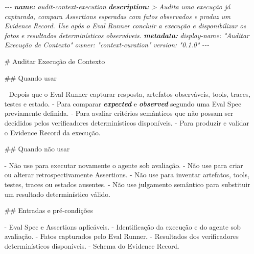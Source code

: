 \documentclass[
  10pt,
  a4paper,
  oneside]{book}
\newenvironment{Shaded}{}{}
\newcommand{\AnnotationTok}[1]{\textcolor[rgb]{0.38,0.63,0.69}{\textbf{\textit{#1}}}}
\newcommand{\CommentTok}[1]{\textcolor[rgb]{0.38,0.63,0.69}{\textit{#1}}}
\newcommand{\FunctionTok}[1]{\textcolor[rgb]{0.02,0.16,0.49}{#1}}
\newcommand{\InformationTok}[1]{\textcolor[rgb]{0.38,0.63,0.69}{\textbf{\textit{#1}}}}
\newcommand{\NormalTok}[1]{#1}
\newcommand{\SpecialStringTok}[1]{\textcolor[rgb]{0.73,0.40,0.53}{#1}}
\renewenvironment{Shaded}{\begin{snugshade}}{\end{snugshade}}%
\begin{document}
\begin{Shaded}
\begin{Highlighting}[]
\CommentTok{{-}{-}{-}}
\AnnotationTok{name:}\CommentTok{ audit{-}context{-}execution}
\AnnotationTok{description:}\CommentTok{ \textgreater{}}
\CommentTok{  Audita uma execução já capturada, compara Assertions esperadas com fatos}
\CommentTok{  observados e produz um Evidence Record. Use após o Eval Runner concluir}
\CommentTok{  a execução e disponibilizar os fatos e resultados determinísticos observáveis.}
\AnnotationTok{metadata:}
\CommentTok{  display{-}name: "Auditar Execução de Contexto"}
\CommentTok{  owner: "context{-}curation"}
\CommentTok{  version: "0.1.0"}
\CommentTok{{-}{-}{-}}

\FunctionTok{\# Auditar Execução de Contexto}

\FunctionTok{\#\# Quando usar}

\SpecialStringTok{{-} }\NormalTok{Depois que o Eval Runner capturar resposta, artefatos observáveis, tools, traces, testes e estado.}
\SpecialStringTok{{-} }\NormalTok{Para comparar }\InformationTok{\textasciigrave{}expected\textasciigrave{}}\NormalTok{ e }\InformationTok{\textasciigrave{}observed\textasciigrave{}}\NormalTok{ segundo uma Eval Spec previamente definida.}
\SpecialStringTok{{-} }\NormalTok{Para avaliar critérios semânticos que não possam ser decididos pelos verificadores determinísticos disponíveis.}
\SpecialStringTok{{-} }\NormalTok{Para produzir e validar o Evidence Record da execução.}

\FunctionTok{\#\# Quando não usar}

\SpecialStringTok{{-} }\NormalTok{Não use para executar novamente o agente sob avaliação.}
\SpecialStringTok{{-} }\NormalTok{Não use para criar ou alterar retrospectivamente Assertions.}
\SpecialStringTok{{-} }\NormalTok{Não use para inventar artefatos, tools, testes, traces ou estados ausentes.}
\SpecialStringTok{{-} }\NormalTok{Não use julgamento semântico para substituir um resultado determinístico válido.}

\FunctionTok{\#\# Entradas e pré{-}condições}

\SpecialStringTok{{-} }\NormalTok{Eval Spec e Assertions aplicáveis.}
\SpecialStringTok{{-} }\NormalTok{Identificação da execução e do agente sob avaliação.}
\SpecialStringTok{{-} }\NormalTok{Fatos capturados pelo Eval Runner.}
\SpecialStringTok{{-} }\NormalTok{Resultados dos verificadores determinísticos disponíveis.}
\SpecialStringTok{{-} }\NormalTok{Schema do Evidence Record.}


\end{Highlighting}
\end{Shaded}
\end{document}
